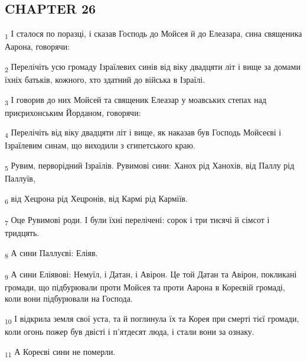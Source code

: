 \subsection{CHAPTER 26}
\begin{tcolorbox}
\textsubscript{1} І сталося по поразці, і сказав Господь до Мойсея й до Елеазара, сина священика Аарона, говорячи:
\end{tcolorbox}
\begin{tcolorbox}
\textsubscript{2} Перелічіть усю громаду Ізраїлевих синів від віку двадцяти літ і вище за домами їхніх батьків, кожного, хто здатний до війська в Ізраїлі.
\end{tcolorbox}
\begin{tcolorbox}
\textsubscript{3} І говорив до них Мойсей та священик Елеазар у моавських степах над приєрихонським Йорданом, говорячи:
\end{tcolorbox}
\begin{tcolorbox}
\textsubscript{4} Перелічіть від віку двадцяти літ і вище, як наказав був Господь Мойсеєві і Ізраїлевим синам, що виходили з єгипетського краю.
\end{tcolorbox}
\begin{tcolorbox}
\textsubscript{5} Рувим, перворідний Ізраїлів. Рувимові сини: Ханох рід Ханохів, від Паллу рід Паллуїв,
\end{tcolorbox}
\begin{tcolorbox}
\textsubscript{6} від Хецрона рід Хецронів, від Кармі рід Карміїв.
\end{tcolorbox}
\begin{tcolorbox}
\textsubscript{7} Оце Рувимові роди. І були їхні перелічені: сорок і три тисячі й сімсот і тридцять.
\end{tcolorbox}
\begin{tcolorbox}
\textsubscript{8} А сини Паллуєві: Еліяв.
\end{tcolorbox}
\begin{tcolorbox}
\textsubscript{9} А сини Еліявові: Немуїл, і Датан, і Авірон. Це той Датан та Авірон, покликані громади, що підбурювали проти Мойсея та проти Аарона в Кореєвій громаді, коли вони підбурювали на Господа.
\end{tcolorbox}
\begin{tcolorbox}
\textsubscript{10} І відкрила земля свої уста, та й поглинула їх та Корея при смерті тієї громади, коли огонь пожер був двісті і п'ятдесят люда, і стали вони за ознаку.
\end{tcolorbox}
\begin{tcolorbox}
\textsubscript{11} А Кореєві сини не померли.
\end{tcolorbox}

